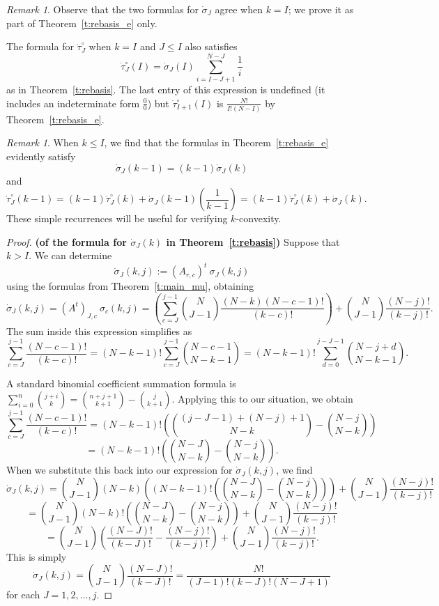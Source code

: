 \documentclass[11pt]{amsart}   %
\theoremstyle{definition}
\theoremstyle{remark}
\newtheorem{remark}[theorem]{Remark}
\numberwithin{equation}{section}
\theoremstyle{theorem}
\begin{document}
\begin{remark}\label{r:agree}
Observe that the two formulas for $\dot\sigma_J$ agree when $k = I$; we prove it as part of Theorem~\ref{t:rebasis_e} only.

The formula for $\dot\tau^\circ_J$ when $k = I$ and $J \leq I$ also satisfies 
\[ \dot\tau_J^\circ(I) = \dot\sigma_J(I) \sum_{i=I-J+1}^{N-J} \frac{1}{i} \]
as in Theorem~\ref{t:rebasis}.  The last entry of this expression is undefined (it includes an indeterminate form $\frac{0}{0}$) but $\dot\tau^\circ_{I+1}(I)$ is $\frac{N!}{I! (N-I)}$ by Theorem~\ref{t:rebasis_e}.
\end{remark}

\begin{remark}\label{r:simple}
When $k \leq I$, we find that the formulas in Theorem~\ref{t:rebasis_e} evidently satisfy
\[ \dot\sigma_J(k-1) = (k-1) \dot\sigma_J(k) \]
and
\[ \dot\tau_J^\circ(k-1) = (k-1) \dot\tau_J^\circ(k) + \dot\sigma_J(k-1) \left(\frac{1}{k-1}\right) = (k-1) \dot\tau_J^\circ(k) + \dot\sigma_J(k). \]
These simple recurrences will be useful for verifying $k$-convexity.
\end{remark}

\begin{proof}{\bf (of the formula for $\dot\sigma_J(k)$ in Theorem~\ref{t:rebasis})}
Suppose that $k > I$.  We can determine 
\[ \dot\sigma_J(k, j) := \left(A_{r,c}\right)^t \ \sigma_J(k, j) \]
using the formulas from Theorem~\ref{t:main_mu}, obtaining
\[ \dot\sigma_J(k, j) = \left(A^t\right)_{J, c} \ \sigma_c(k, j) = \left( \sum_{c = J}^{j-1} {N \choose {J-1}} \frac{(N-k)(N-c-1)!}{(k-c)!} \right) + {N \choose {J-1}} \frac{(N-j)!}{(k-j)!}. \]
The sum inside this expression simplifies as
\[ \sum_{c = J}^{j-1} \frac{(N-c-1)!}{(k-c)!}  
= (N-k-1)! \sum_{c = J}^{j-1} {{N-c-1} \choose {N-k-1}} 
= (N-k-1)! \sum_{d = 0}^{j-J-1} {{N-j+d} \choose {N-k-1}}. \]

A standard binomial coefficient summation formula is $\sum_{i=0}^n { {j+i} \choose {k} } = { {n+j+1} \choose {k+1} } - {j \choose {k+1}}$.  Applying this to our situation, we obtain
\[ \sum_{c = J}^{j-1} \frac{(N-c-1)!}{(k-c)!}  
= (N-k-1)!  \left( { { (j-J-1) + (N-j) + 1 } \choose { N-k } } - { {N-j} \choose {N-k} } \right) \]
\[ = (N-k-1)!  \left( { {N-J} \choose {N-k} } - { {N-j} \choose {N-k} } \right). \]
When we substitute this back into our expression for $\dot\sigma_J(k, j)$, we find
\[ \dot\sigma_J(k, j) =  {N \choose {J-1}} (N-k) \left( (N-k-1)!  \left( { {N-J} \choose {N-k} } - { {N-j} \choose {N-k} } \right) \right) + {N \choose {J-1}} \frac{(N-j)!}{(k-j)!} \]
\[ =  {N \choose {J-1}} (N-k)! \left( { {N-J} \choose {N-k} } - { {N-j} \choose {N-k} } \right) + {N \choose {J-1}} \frac{(N-j)!}{(k-j)!}  \]
\[ =  {N \choose {J-1}} \left( \frac{(N-J)!}{(k-J)!} - \frac{(N-j)!}{(k-j)!} \right) + {N \choose {J-1}} \frac{(N-j)!}{(k-j)!}.  \]
This is simply
\[ \dot\sigma_J(k, j) =  {N \choose {J-1}} \frac{(N-J)!}{(k-J)!} = \frac{N!}{(J-1)!(k-J)!(N-J+1)} \]
for each $J = 1, 2, \ldots, j$.
\end{proof}
\end{document}
